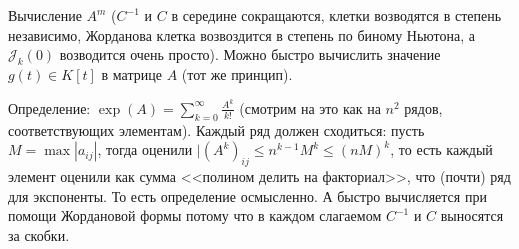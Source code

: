 \section{} %
Вычисление $A^m$ ($C^{-1}$ и $C$ в середине сокращаются, клетки возводятся в степень независимо, Жорданова клетка возвоздится в степень по биному Ньютона, а $\mathcal{J}_k(0)$ возводится очень просто).
Можно быстро вычислить значение $g(t) \in K[t]$ в матрице $A$ (тот же принцип).

Определение:
$\exp(A) = \sum_{k=0}^\infty \frac{A^k}{k!}$ (смотрим на это как на $n^2$ рядов, соответствующих элементам).
Каждый ряд должен сходиться: пусть $M=\max |a_{ij}|$, тогда оценили $|(A^k)_{ij} \le n^{k-1}M^k \le (nM) ^ k$, то есть каждый элемент оценили как сумма <<полином делить на факториал>>, что (почти) ряд для экспоненты.
То есть определение осмысленно.
А быстро вычисляется при помощи Жордановой формы потому что в каждом слагаемом $C^{-1}$ и $C$ выносятся за скобки.
